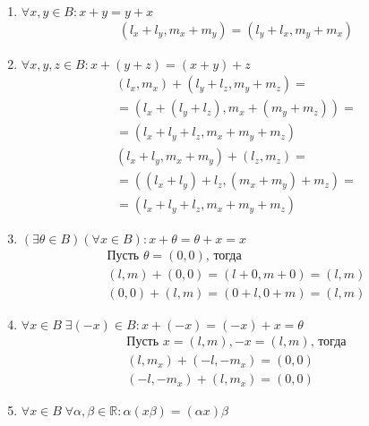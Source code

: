 \begin{enumerate}
    \item {
          $\forall x, y \in B: x + y  = y + x$
          \begin{align*}
              \left(l_x + l_y, m_x + m_y\right) = \left(l_y + l_x, m_y + m_x\right)
          \end{align*}
          }
    \item {
          $\forall x,y,z \in B: x + (y + z) = (x + y) + z$
          \begin{align*}
              \left(l_x, m_x\right) + \left(l_y + l_z, m_y + m_z\right) = \\
              =\left(l_x + (l_y + l_z), m_x + (m_y + m_z)\right) =        \\
              =\left(l_x + l_y + l_z, m_x + m_y + m_z\right)
          \end{align*}
          \begin{align*}
              \left(l_x + l_y, m_x + m_y\right) + \left(l_z, m_z\right) = \\
              =\left((l_x + l_y) + l_z, (m_x + m_y) + m_z\right) =        \\
              =\left(l_x + l_y + l_z, m_x + m_y + m_z\right)
          \end{align*}
          }
    \item {
          $(\exists \theta \in B)(\forall x \in B): x + \theta = \theta + x = x$
          \begin{align*}
              \text{Пусть }\theta = (0, 0)\text{, тогда}       \\
              ( l,m) + (0, 0) = \left(l+0,m + 0\right) = (l,m) \\
              (0,0) + (l,m) = \left(0+l,0 + m\right) = (l,m)
          \end{align*}
          }
    \item {
          $\forall x \in B \; \exists (-x) \in B:x+(-x)=(-x)+x=\theta$
          \begin{align*}
              \text{Пусть }x = (l,m), -x = (l, m)\text{, тогда} \\
              (l,m_x) + (-l,-m_x) =(0,0)                        \\
              (-l,-m_x) + (l,m_x) =(0,0)
          \end{align*}
          }
    \item {
          $\forall x \in B \; \forall \alpha, \beta \in \mathbb{R}:\alpha(x\beta)=(\alpha x)\beta$
          \begin{align*}

\end{align*}}
\end{enumerate}
